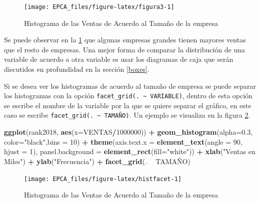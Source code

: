 \documentclass[
]{krantz}
\makeatletter
\newenvironment{Shaded}{\begin{snugshade}}{\end{snugshade}}
\newcommand{\DataTypeTok}[1]{\textcolor[rgb]{0.27,0.27,0.27}{#1}}
\newcommand{\DecValTok}[1]{\textcolor[rgb]{0.06,0.06,0.06}{#1}}
\newcommand{\FloatTok}[1]{\textcolor[rgb]{0.06,0.06,0.06}{#1}}
\newcommand{\KeywordTok}[1]{\textcolor[rgb]{0.27,0.27,0.27}{\textbf{#1}}}
\newcommand{\NormalTok}[1]{#1}
\newcommand{\OperatorTok}[1]{\textcolor[rgb]{0.43,0.43,0.43}{\textbf{#1}}}
\newcommand{\StringTok}[1]{\textcolor[rgb]{0.5,0.5,0.5}{#1}}
\newenvironment{kframe}{%
\medskip{}
\setlength{\fboxsep}{.8em}
 \def\at@end@of@kframe{}%
 \ifinner\ifhmode%
  \def\at@end@of@kframe{\end{minipage}}%
  \begin{minipage}{\columnwidth}%
 \fi\fi%
 \def\FrameCommand##1{\hskip\@totalleftmargin \hskip-\fboxsep
 \colorbox{shadecolor}{##1}\hskip-\fboxsep
     \hskip-\linewidth \hskip-\@totalleftmargin \hskip\columnwidth}%
 \MakeFramed {\advance\hsize-\width
   \@totalleftmargin\z@ \linewidth\hsize
   \@setminipage}}%
 {\par\unskip\endMakeFramed%
 \at@end@of@kframe}
\renewenvironment{Shaded}{\begin{kframe}}{\end{kframe}}
\makeatother
\begin{document}
\begin{figure}[h!]

{\centering \texttt{[image: EPCA\_files/figure-latex/figura3-1]} 

}

\caption{Histograma de las Ventas de Acuerdo al Tamaño de la empresa}\label{fig:figura3}
\end{figure}

Se puede observar en la \ref{fig:figura3} que algunas empresas grandes tienen mayores ventas que el resto de empresas. Una mejor forma de comparar la distribución de una variable de acuerdo a otra variable es usar los diagramas de caja que serán discutidos en profundidad en la sección \ref{boxes}.

Si se desea ver los histogramas de acuerdo al tamaño de empresa se puede separar los histogramas con la opción \texttt{facet\_grid(.\ \textasciitilde{}\ VARIABLE)}, dentro de esta opción se escribe el nombre de la variable por la que se quiere separar el gráfico, en este caso se escribe \texttt{facet\_grid(.\ \textasciitilde{}\ TAMAÑO)}. Un ejemplo se visualiza en la figura \ref{fig:histfacet}.

\begin{Shaded}
\begin{Highlighting}[]
\KeywordTok{ggplot}\NormalTok{(rank2018, }\KeywordTok{aes}\NormalTok{(}\DataTypeTok{x=}\NormalTok{VENTAS}\OperatorTok{/}\DecValTok{1000000}\NormalTok{)) }\OperatorTok{+}\StringTok{ }
\StringTok{  }\KeywordTok{geom_histogram}\NormalTok{(}\DataTypeTok{alpha=}\FloatTok{0.3}\NormalTok{, }\DataTypeTok{color=}\StringTok{"black"}\NormalTok{,}\DataTypeTok{bins =} \DecValTok{10}\NormalTok{) }\OperatorTok{+}
\StringTok{  }\KeywordTok{theme}\NormalTok{(}\DataTypeTok{axis.text.x =} \KeywordTok{element_text}\NormalTok{(}\DataTypeTok{angle =} \DecValTok{90}\NormalTok{, }\DataTypeTok{hjust =} \DecValTok{1}\NormalTok{), }
        \DataTypeTok{panel.background =} \KeywordTok{element_rect}\NormalTok{(}\DataTypeTok{fill=}\StringTok{"white"}\NormalTok{)) }\OperatorTok{+}
\StringTok{  }\KeywordTok{xlab}\NormalTok{(}\StringTok{"Ventas en Miles"}\NormalTok{) }\OperatorTok{+}\StringTok{ }\KeywordTok{ylab}\NormalTok{(}\StringTok{"Frecuencia"}\NormalTok{) }\OperatorTok{+}
\StringTok{  }\KeywordTok{facet_grid}\NormalTok{(. }\OperatorTok{~}\StringTok{ }\NormalTok{TAMAÑO)}
\end{Highlighting}
\end{Shaded}

\begin{figure}[h!]

{\centering \texttt{[image: EPCA\_files/figure-latex/histfacet-1]} 

}

\caption{Histograma de las Ventas de Acuerdo al Tamaño de la empresa}\label{fig:histfacet}
\end{figure}
\end{document}

